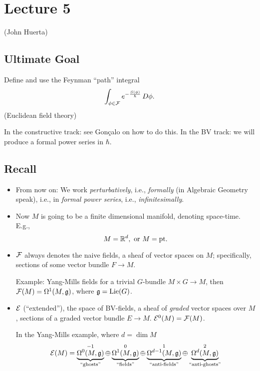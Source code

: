 \chapter{Lecture 5}

(John Huerta)

\section{Ultimate Goal}

Define and use the Feynman ``path'' integral
\begin{equation*}
  \int_{\phi \in \mathcal{F}} e^{-\frac{S (\phi)}{\hbar}} \, D\phi .
\end{equation*}
(Euclidean field theory)

In the constructive track: see Gonçalo on how to do this. In the BV
track: we will produce a formal power series in $\hbar$.

\section{Recall}

\begin{itemize}
\item From now on: We work {\em perturbatively}, i.e., {\em formally}
  (in Algebraic Geometry speak), i.e., in {\em formal power series},
  i.e., {\em infinitesimally}.
\item Now $M$ is going to be a finite dimensional manifold, denoting space-time. E.g.,
  \[
    M = \mathbb{R}^d, \mbox{ or } M = \mathrm{pt}.
  \]
\item $\mathcal{F}$ always denotes the naive fields, a sheaf of vector
  spaces on $M$; specifically, sections of some vector bundle
  $F\longrightarrow M$.

  Example: Yang-Mills fields for a trivial $G$-bundle
  $M\times G \longrightarrow M$, then
  $\mathcal{F} (M)=\Omega^1 (M,\mathfrak{g})$, where
  $\mathfrak{g}=\mathrm{Lie} (G)$.
\item $\mathcal{E}$ (``extended''), the space of BV-fields, a sheaf of {\em
    graded} vector spaces over $M$, sections of a graded vector bundle
  $E\longrightarrow M$. $\mathcal{E}^0 (M)=\mathcal{F} (M)$.

  In the Yang-Mills example, where $d=\dim M$
  \begin{equation*}
    \mathcal{E}(M) = \underbrace{\Omega^0 (M,\mathfrak{g})}_{\text{``ghosts''}}^{-1}
    \oplus\underbrace{\Omega^1(M,\mathfrak{g})}_{\text{``fields''}}^{0}
    \oplus\underbrace{\Omega^{d-1} (M,\mathfrak{g})}_{\text{``anti-fields''}}^{1}
    \oplus\underbrace{\Omega^d(M,\mathfrak{g})}_{\text{``anti-ghosts''}}^{2}
  \end{equation*}
\end{itemize}

